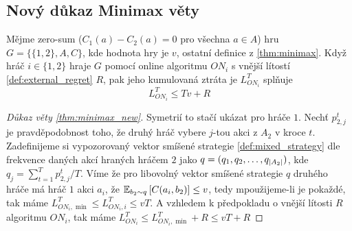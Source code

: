 \subsection{Nový důkaz Minimax věty}
\begin{theorem}
\label{thm:minimax_new}
Mějme zero-sum ($C_1(a) - C_2(a) = 0$ pro všechna $a \in A$) hru $G = \{\{1,2\}, A, C\}$, kde hodnota hry je $v$, ostatní definice z \ref{thm:minimax}. 
Když hráč $i\in \{1,2\}$ hraje $G$ pomocí online algoritmu $ON_i$ s vnější lítostí \ref{def:external_regret} $R$, pak jeho kumulovaná ztráta je $L_{ON_i}^T$ splňuje 
\[
    L_{ON_i}^T \leq Tv + R
\]
\end{theorem}

\begin{proof}[Důkaz věty \ref{thm:minimax_new}]
    Symetrií to stačí ukázat pro hráče $1$. 
    Nechť $p^t_{2,j}$ je pravděpodobnost toho, že druhý hráč vybere $j$-tou akci z $A_2$ v kroce $t$. 
    Zadefinijeme si vypozorovaný vektor smíšené strategie \ref{def:mixed_strategy} dle frekvence daných akcí hraných hráčem $2$ jako $q = (q_1,q_2,\dots,q_{\abs{A_2}})$, kde $q_j = \sum^T_{t=1} p^t_{2,j}/T$. Víme že pro libovolný vektor smíšené strategie $q$ druhého hráče má hráč $1$ akci $a_i$, že $\E[b_2\sim q]{C(a_i, b_2)} \leq v$, tedy mpoužijeme-li je pokaždé, tak máme $L^T_{ON_i,\min} \leq L^T_{ON_i,i} \leq vT$. 
    A vzhledem k předpokladu o vnější lítosti $R$ algoritmu $ON_i$, tak máme $L^T_{ON_i} \leq L^T_{ON_i,\min} + R \leq  vT +R$
\end{proof}

